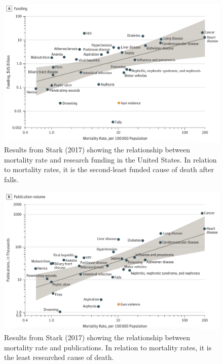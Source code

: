 \documentclass{article}
\begin{document}
\pagebreak
\begin{figure} [htbp] \centering
 \includegraphics[scale = 0.35]{figures/Stark_Funding}
 \caption{Results from Stark (2017) showing the relationship between mortality rate and research funding in the United States. In relation to mortality rates, it is the second-least funded cause of death after falls.}
\end{figure}

\begin{figure} [htbp] \centering
 \includegraphics[scale = 0.35]{figures/Stark_Publication}
 \caption{Results from Stark (2017) showing the relationship between mortality rate and publications. In relation to mortality rates, it is the least researched cause of death.}
\end{figure}

\clearpage
\end{document}
